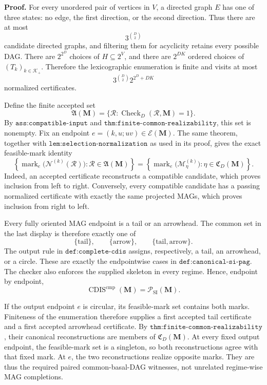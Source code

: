 \textbf{Proof.}
For every unordered pair of vertices in \(V\), a directed graph \(E\) has one of three states: no edge, the first direction, or the second direction.  Thus there are at most
\[
3^{\binom D2}
\]
candidate directed graphs, and filtering them for acyclicity retains every possible DAG.  There are \(2^{2^D}\) choices of \(H\subseteq 2^V\), and there are \(2^{DK}\) ordered choices of \((T_k)_{k\in\mathcal K_+}\).  Therefore the lexicographic enumeration is finite and visits at most
\[
3^{\binom D2}2^{2^D+DK}
\]
normalized certificates.

Define the finite accepted set
\[
\mathfrak A(\mathbf M)
=\{\mathcal R:\operatorname{Check}_{D}(\mathcal R,\mathbf M)=1\}.
\]
By \(\texttt{ass:compatible-input}\) and \(\texttt{thm:finite-common-realizability}\), this set is nonempty.  Fix an endpoint \(e=(k,u;uv)\in\mathcal E(\mathbf M)\).  The same theorem, together with \(\texttt{lem:selection-normalization}\) as used in its proof, gives the exact feasible-mark identity
\[
\left\{
\operatorname{mark}_e\bigl(\mathcal N^{(k)}(\mathcal R)\bigr):
\mathcal R\in\mathfrak A(\mathbf M)
\right\}
=
\left\{
\operatorname{mark}_e\bigl(\mathcal M_\eta^{(k)}\bigr):
\eta\in\mathfrak C_D(\mathbf M)
\right\}.
\]
Indeed, an accepted certificate reconstructs a compatible candidate, which proves inclusion from left to right.  Conversely, every compatible candidate has a passing normalized certificate with exactly the same projected MAGs, which proves inclusion from right to left.

Every fully oriented MAG endpoint is a tail or an arrowhead.  The common set in the last display is therefore exactly one of
\[
\{\mathrm{tail}\},
\qquad
\{\mathrm{arrow}\},
\qquad
\{\mathrm{tail},\mathrm{arrow}\}.
\]
The output rule in \(\texttt{def:complete-cdis}\) assigns, respectively, a tail, an arrowhead, or a circle.  These are exactly the endpointwise cases in \(\texttt{def:canonical-si-pag}\).  The checker also enforces the supplied skeleton in every regime.  Hence, endpoint by endpoint,
\[
\operatorname{CDIS}^{\mathrm{cmp}}(\mathbf M)
=\mathcal P_{\mathrm{SI}}(\mathbf M).
\]

If the output endpoint \(e\) is circular, its feasible-mark set contains both marks.  Finiteness of the enumeration therefore supplies a first accepted tail certificate and a first accepted arrowhead certificate.  By \(\texttt{thm:finite-common-realizability}\), their canonical reconstructions are members of \(\mathfrak C_D(\mathbf M)\).  At every fixed output endpoint, the feasible-mark set is a singleton, so both reconstructions agree with that fixed mark.  At \(e\), the two reconstructions realize opposite marks.  They are thus the required paired common-basal-DAG witnesses, not unrelated regime-wise MAG completions.

